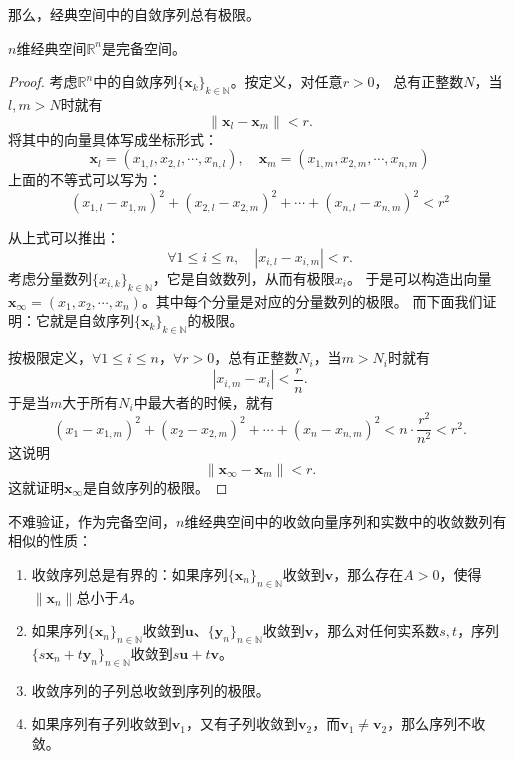 \documentclass[12pt,UTF8,fontset=none]{ctexbook}
\begin{document}
\begin{appendix}
那么，经典空间中的自敛序列总有极限。
\begin{tm}\label{tm:b-0-40}
    $n$维经典空间$\mathbb{R}^n$是完备空间。
\end{tm}

\begin{proof}
    考虑$\mathbb{R}^n$中的自敛序列$\{\mathbf{x}_k\}_{k\in\mathbb{N}}$。按定义，对任意$r>0$，
    总有正整数$N$，当$l, m>N$时就有
    $$ \| \mathbf{x}_l - \mathbf{x}_m\| < r. $$
    将其中的向量具体写成坐标形式：
    $$ \mathbf{x}_l = (x_{1,l},x_{2,l}, \cdots, x_{n,l}), \quad \mathbf{x}_m = (x_{1,m},x_{2,m}, \cdots, x_{n,m})$$
    上面的不等式可以写为：
    $$ (x_{1,l} - x_{1,m})^2 + (x_{2,l} - x_{2,m})^2 + \cdots + (x_{n,l} - x_{n,m})^2 < r^2$$

    从上式可以推出：
    $$ \forall 1\leqslant i \leqslant n, \quad |x_{i,l} - x_{i,m} | < r. $$
    考虑分量数列$\{x_{i,k}\}_{k\in\mathbb{N}}$，它是自敛数列，从而有极限$x_i$。
    于是可以构造出向量$\mathbf{x}_{\infty} = (x_1,x_2,\cdots, x_n)$。其中每个分量是对应的分量数列的极限。
    而下面我们证明：它就是自敛序列$\{\mathbf{x}_k\}_{k\in\mathbb{N}}$的极限。

    按极限定义，$\forall 1\leqslant i \leqslant n$，$\forall r>0$，总有正整数$N_i$，当$m>N_i$时就有
    $$ | x_{i,m} - x_i| < \frac{r}{n}. $$
    于是当$m$大于所有$N_i$中最大者的时候，就有
    $$ (x_1 - x_{1,m})^2 + (x_2 - x_{2,m})^2 + \cdots + (x_n - x_{n,m})^2 < n\cdot \frac{r^2}{n^2} < r^2.$$
    这说明
    $$ \| \mathbf{x}_{\infty} - \mathbf{x}_m \| < r. $$
    这就证明$\mathbf{x}_{\infty}$是自敛序列的极限。

\end{proof}

不难验证，作为完备空间，$n$维经典空间中的收敛向量序列和实数中的收敛数列有相似的性质：
\begin{enumerate}
    \item 收敛序列总是有界的：如果序列$\{\mathbf{x}_n\}_{n\in\mathbb{N}}$收敛到$\mathbf{v}$，那么存在$A>0$，使得$\|\mathbf{x}_n\|$总小于$A$。
    \item 如果序列$\{\mathbf{x}_n\}_{n\in\mathbb{N}}$收敛到$\mathbf{u}$、$\{\mathbf{y}_n\}_{n\in\mathbb{N}}$收敛到$\mathbf{v}$，那么对任何实系数$s,t$，序列$\{s\mathbf{x}_n + t\mathbf{y}_n\}_{n\in\mathbb{N}}$收敛到$s\mathbf{u} + t\mathbf{v}$。
    \item 收敛序列的子列总收敛到序列的极限。
    \item 如果序列有子列收敛到$\mathbf{v}_1$，又有子列收敛到$\mathbf{v}_2$，而$\mathbf{v}_1\neq \mathbf{v}_2$，那么序列不收敛。
\end{enumerate}


\end{appendix}
\end{document}
